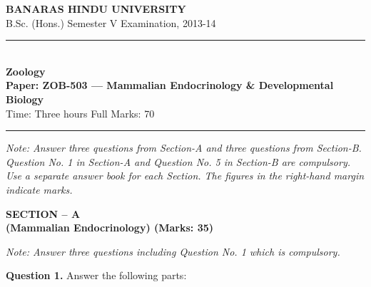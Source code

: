 \documentclass[11pt,a4paper]{article}
\begin{document}
\begin{center}
  {\large\bfseries BANARAS HINDU UNIVERSITY}\\[2pt]
  {\normalsize B.Sc. (Hons.) Semester V Examination, 2013-14}\\[6pt]
  \rule{0.8\linewidth}{0.5pt}\\[6pt]
  {\large\bfseries Zoology}\\[4pt]
  {\large\bfseries Paper: ZOB-503 --- Mammalian Endocrinology \& Developmental Biology}\\[4pt]
  {\normalsize Time: Three hours \hfill Full Marks: 70}
\end{center}

\rule{\linewidth}{0.4pt}

\smallskip



\noindent   \textit{Note: Answer three questions from Section-A and three questions from Section-B. Question No. 1 in Section-A and Question No. 5 in Section-B are compulsory. Use a separate answer book for each Section. The figures in the right-hand margin indicate marks.}

\bigskip

\begin{center}
   \textbf{SECTION -- A} \\
   \textbf{(Mammalian Endocrinology) (Marks: 35)}
\end{center}

\smallskip



\noindent   \textit{Note: Answer three questions including Question No. 1 which is compulsory.}

\medskip


\noindent   \textbf{Question 1.} Answer the following parts:
\end{document}

